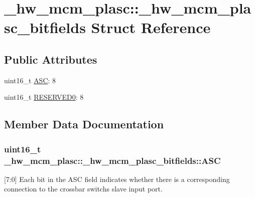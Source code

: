 \hypertarget{struct__hw__mcm__plasc_1_1__hw__mcm__plasc__bitfields}{}\section{\+\_\+hw\+\_\+mcm\+\_\+plasc\+:\+:\+\_\+hw\+\_\+mcm\+\_\+plasc\+\_\+bitfields Struct Reference}
\label{struct__hw__mcm__plasc_1_1__hw__mcm__plasc__bitfields}
\subsection*{Public Attributes}
\begin{DoxyCompactItemize}
\item 
uint16\+\_\+t \hyperlink{struct__hw__mcm__plasc_1_1__hw__mcm__plasc__bitfields_aa20b01457e7461824fb516f2520c36c9}{A\+SC}\+: 8
\item 
uint16\+\_\+t \hyperlink{struct__hw__mcm__plasc_1_1__hw__mcm__plasc__bitfields_aa9ecfa1d14dcf667c400a19c4b6164bb}{R\+E\+S\+E\+R\+V\+E\+D0}\+: 8
\end{DoxyCompactItemize}


\subsection{Member Data Documentation}
\subsubsection[{\texorpdfstring{A\+SC}{ASC}}]{\setlength{\rightskip}{0pt plus 5cm}uint16\+\_\+t \+\_\+hw\+\_\+mcm\+\_\+plasc\+::\+\_\+hw\+\_\+mcm\+\_\+plasc\+\_\+bitfields\+::\+A\+SC}\hypertarget{struct__hw__mcm__plasc_1_1__hw__mcm__plasc__bitfields_aa20b01457e7461824fb516f2520c36c9}{}\label{struct__hw__mcm__plasc_1_1__hw__mcm__plasc__bitfields_aa20b01457e7461824fb516f2520c36c9}
\mbox{[}7\+:0\mbox{]} Each bit in the A\+SC field indicates whether there is a corresponding connection to the crossbar switch\textquotesingle{}s slave input port. 
